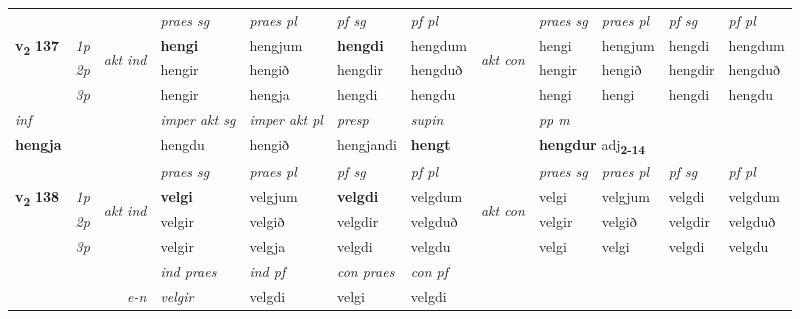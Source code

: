 \begin{longtable}[l]{X>{\footnotesize\itshape}llXXXXlXXXX}
 & &   & \textit{praes sg}  & \textit{praes pl}    & \textit{ pf sg} & \textit{pf pl} & & \textit{praes sg}  & \textit{praes pl}    & \textit{pf sg} & \textit{pf pl }  \\ \cmidrule{4-7} \cmidrule{9-12}
 \multirow{2}{*}{{{\textbf{v{\textsubscript{2}}} \Large{\textbf{137}}}}}  & 1p & \multirow{3}{*}{\begin{turn}{90}\textit{akt ind}\end{turn}} & \textbf{hengi} & hengjum & \textbf{hengdi} & hengdum & \multirow{3}{*}{\begin{turn}{90}\textit{akt con}\end{turn}} &hengi & hengjum & hengdi & hengdum\\*
 & 2p &  &  hengir  & hengið & hengdir & hengduð & & hengir & hengið & hengdir & hengduð \\*
 & 3p &  & hengir & hengja & hengdi & hengdu & & hengi & hengi& hengdi & hengdu \\*
\cmidrule{4-7} \cmidrule{9-12}

   {\textit{inf}} & &  & \textit{imper akt sg} & \textit{imper akt pl}   & \textit{presp} & \textit{supin}  && \textit{pp m} \\*
  {\textbf{hengja}} & && hengdu  & hengið   & hengjandi &  \textbf{hengt}  && \multicolumn{2}{l}{\textbf{hengdur} adj\textbf{\textsubscript{2-14}}} \\*

\midrule

 & &   & \textit{praes sg}  & \textit{praes pl}    & \textit{ pf sg} & \textit{pf pl} & & \textit{praes sg}  & \textit{praes pl}    & \textit{pf sg} & \textit{pf pl }  \\ \cmidrule{4-7} \cmidrule{9-12}
 \multirow{2}{*}{{{\textbf{v{\textsubscript{2}}} \Large{\textbf{138}}}}}  & 1p & \multirow{3}{*}{\begin{turn}{90}\textit{akt ind}\end{turn}} & \textbf{velgi} & velgjum & \textbf{velgdi} & velgdum & \multirow{3}{*}{\begin{turn}{90}\textit{akt con}\end{turn}} &velgi & velgjum & velgdi & velgdum\\*
 & 2p &  &  velgir  & velgið & velgdir & velgduð & & velgir & velgið & velgdir & velgduð \\*
 & 3p &  & velgir & velgja & velgdi & velgdu & & velgi & velgi& velgdi & velgdu \\*
\cmidrule{4-7} \cmidrule{9-12}

   && &  \textit{ind praes} & \textit{ind pf} & \textit{con praes} & \textit{con pf} \\*
\multicolumn{3}{r}{\textit{e-n}} & velgir & velgdi & velgi & velgdi \\*


\end{longtable}
